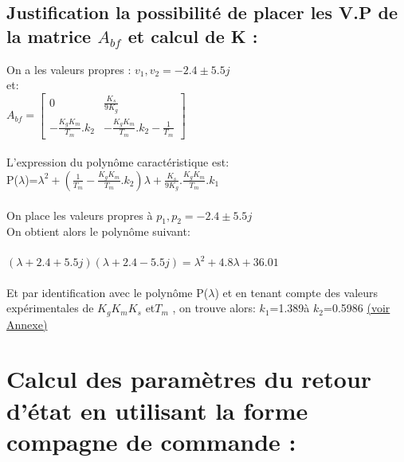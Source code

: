 \subsection{Justification la possibilité de placer les V.P de la matrice $A_{bf}$ et calcul de K :}

On a les valeurs propres : $v_{1},v_{2}=-2.4\pm5.5j$ \\
et:\\
$A_{bf}=
\begin{bmatrix} 
0 & \frac{K_{s}}{9K_{g}} \\
-\frac{K_{g}K_{m}}{T_{m}}.k_{2} & -\frac{K_{g}K_{m}}{T_{m}}.k_{2}-\frac{1}{T_{m}}
\end{bmatrix}$ \\\\

L'expression du polynôme caractéristique est:\\
P($\lambda$)=$\lambda^2+(\frac{1}{T_{m}}-\frac{K_{g}K_{m}}{T_{m}}.k_{2})\lambda+\frac{K_{s}}{9K_{g}}.\frac{K_{g}K_{m}}{T_{m}}.k_{1}$\\\\

On place les valeurs propres à $p_{1},p_{2}=-2.4\pm5.5j$\\

On obtient alors le polynôme suivant: \\\\
$(\lambda+2.4+5.5j)(\lambda+2.4-5.5j)={\lambda}^2+4.8\lambda+36.01$\\\\

Et par identification avec le polynôme P($\lambda$) et en tenant compte des valeurs expérimentales de $K_{g} K_{m} K_{s}$ et$T_{m}$ , on trouve alors:  $k_1$=1.389à \quad $k_2$=0.5986 \hyperref[section1.1]{(voir Annexe)}\label{annexe1}\\



\section{Calcul des paramètres du retour d'état en utilisant la forme compagne de commande :}
